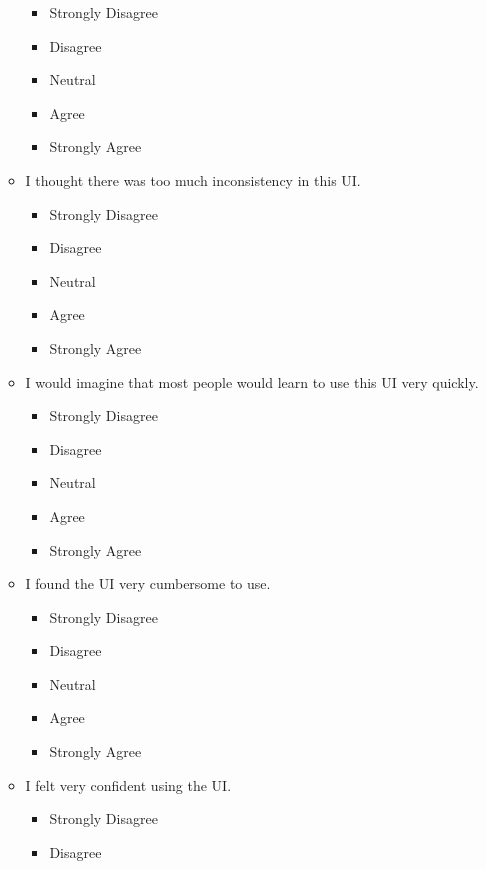 \documentclass[doublespace,draft,nopageskip]{VTthesis} %
\begin{document}
\begin{itemize}
\begin{itemize}
            \begin{itemize}
                \item Strongly Disagree
                \item Disagree
                \item Neutral
                \item Agree
                \item Strongly Agree
            \end{itemize}
        \item I thought there was too much inconsistency in this UI.
            \begin{itemize}
                \item Strongly Disagree
                \item Disagree
                \item Neutral
                \item Agree
                \item Strongly Agree
            \end{itemize}
        \item I would imagine that most people would learn to use this UI very quickly.
            \begin{itemize}
                \item Strongly Disagree
                \item Disagree
                \item Neutral
                \item Agree
                \item Strongly Agree
            \end{itemize}
        \item I found the UI very cumbersome to use.
            \begin{itemize}
                \item Strongly Disagree
                \item Disagree
                \item Neutral
                \item Agree
                \item Strongly Agree
            \end{itemize}
	\item I felt very confident using the UI.
            \begin{itemize}
                \item Strongly Disagree
                \item Disagree

\end{itemize}
\end{itemize}
\end{itemize}
\end{document}
